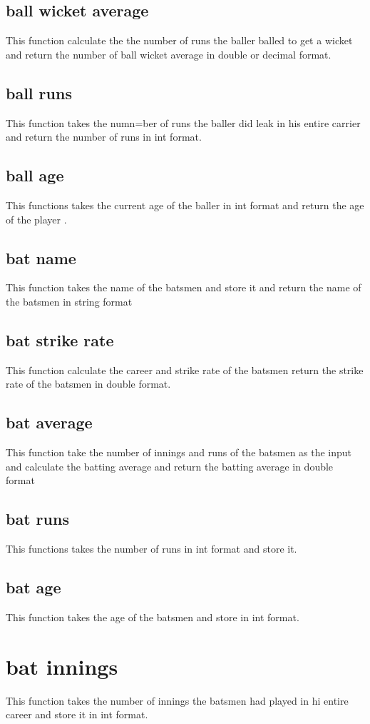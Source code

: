 \documentclass{article}
\begin{document}
\subsection{ball wicket average}
This function calculate the the number of runs the baller balled to get a wicket and return the number of ball wicket average in double or decimal format.
\subsection{ball runs}
This function takes the numn=ber of runs the baller did leak in his entire carrier and return the number of runs in int format.
\subsection{ball age}
This functions takes the current age of the baller in int format and return the age of the player .
\subsection{bat name}
This function takes the name of the batsmen and store it and return the name of the batsmen in string format
\subsection{bat strike rate}
This function calculate the career and strike rate of the batsmen return the strike rate of the batsmen in double format.
\subsection{bat average}
This function take the number of innings and runs of the batsmen as the input and calculate the batting average and return the batting average in double format
\subsection{bat runs}
This functions takes the number of runs in int format and store it.
\subsection{bat age}
This function takes the age of the batsmen and store in int format.
\section{bat innings}
This function takes the number of innings the batsmen had played in hi entire career and store it in int format.
\end{document}
